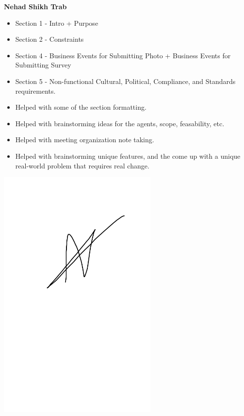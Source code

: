 \documentclass[]{article}
\begin{document}
\textbf{Nehad Shikh Trab}
\begin{itemize}
    \setlength\itemindent{2em}
\item Section 1 - Intro + Purpose
\item Section 2 - Constraints
\item Section 4 -  Business Events for Submitting Photo + Business Events for Submitting Survey
\item Section 5 - Non-functional Cultural, Political, Compliance, and Standards requirements.
\item Helped with some of the section formatting.
\item Helped with brainstorming ideas for the agents, scope, feasability, etc.
\item Helped with meeting organization note taking.
\item Helped with brainstorming unique features, and the come up with a unique real-world problem that requires real change.
\end{itemize}
\includegraphics[width=0.6\textwidth]{Nehad.png}
\end{document}
